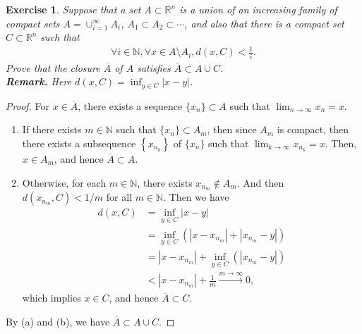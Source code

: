 \documentclass[11pt]{article}
\newtheorem{exercise}{Exercise}[section]
\theoremstyle{definition}
\numberwithin{equation}{subsection}
\begin{document}
\begin{exercise}
Suppose that a set $A \subset \mathbb{R}^n$ is a union of an increasing family of compact sets $A = \cup^\infty_{i=1} A_i$, $A_1 \subset A_2 \subset \cdots$, and also that there is a compact set $C \subset \mathbb{R}^n$ such that 
\begin{align*}
    \forall i \in \mathbb{N}, \forall x \in A \setminus A_i, d(x, C) < \frac{1}{i}.
\end{align*}
Prove that the closure $\overline{A}$ of $A$ satisfies $\overline{A} \subset A \cup C$.\\
{\bf Remark.} Here $d(x, C) = \inf_{y \in C}|x - y|$.
\end{exercise}
\begin{proof}
For $x \in \overline{A}$, there exists a sequence $\{x_n\} \subset A$ such that $\lim_{n\to\infty} x_n = x$.
\begin{enumerate}[label=(\alph*)]
    \item If there exists $m \in \mathbb{N}$ such that $\{x_n\} \subset A_m$, then since $A_m$ is compact, then there exists a subsequence $\left\{x_{n_k}\right\}$ of $\{x_n\}$ such that $\lim_{k\to\infty} x_{n_k} = x$. Then, $x \in A_m$, and hence $\overline{A} \subset A$.
    
    \item Otherwise, for each $m \in \mathbb{N}$, there exists $x_{n_m} \notin A_m$. And then $d\left(x_{n_m}, C\right) < 1/m$ for all $m \in \mathbb{N}$. Then we have
    \begin{align*}
        d(x, C) & = \inf_{y \in C} |x - y| \\
        & = \inf_{y \in C} \left( |x - x_{n_m}| + |x_{n_m} - y| \right) \\
        & = |x - x_{n_m}| + \inf_{y \in C} \left(|x_{n_m} - y| \right) \\
        & < |x - x_{n_m}| + \frac{1}{m} \xrightarrow[]{m \to \infty} 0,
    \end{align*}
    which implies $x \in C$, and hence $\overline{A} \subset C$.
\end{enumerate}
By (a) and (b), we have $\overline{A} \subset A \cup C$.
\end{proof}

\medskip
\end{document}

